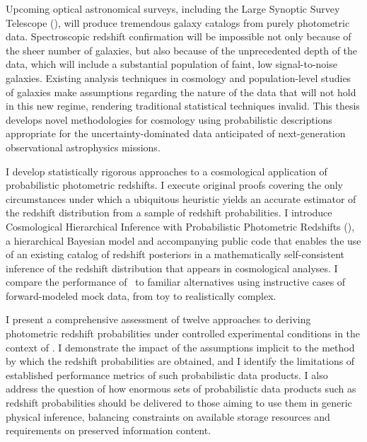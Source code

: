 Upcoming optical astronomical surveys, including the Large Synoptic Survey Telescope (\lsst), will produce tremendous galaxy catalogs from purely photometric data.
Spectroscopic redshift confirmation will be impossible not only because of the sheer number of galaxies, but also because of the unprecedented depth of the data, which will include a substantial population of faint, low signal-to-noise galaxies.
Existing analysis techniques in cosmology and population-level studies of galaxies make assumptions regarding the nature of the data that will not hold in this new regime, rendering traditional statistical techniques invalid.
This thesis develops novel methodologies for cosmology using probabilistic descriptions appropriate for the uncertainty-dominated data anticipated of next-generation observational astrophysics missions. 

I develop statistically rigorous approaches to a cosmological application of probabilistic photometric redshifts.
I execute original proofs covering the only circumstances under which a ubiquitous heuristic yields an accurate estimator of the redshift distribution from a sample of redshift probabilities.
I introduce Cosmological Hierarchical Inference with Probabilistic Photometric Redshifts (\Chippr), a hierarchical Bayesian model and accompanying public code that enables the use of an existing catalog of redshift posteriors in a mathematically self-consistent inference of the redshift distribution that appears in cosmological analyses.
I compare the performance of \Chippr\ to familiar alternatives using instructive cases of forward-modeled mock data, from toy to realistically complex.

I present a comprehensive assessment of twelve approaches to deriving photometric redshift probabilities under controlled experimental conditions in the context of \lsst.
I demonstrate the impact of the assumptions implicit to the method by which the redshift probabilities are obtained, and I identify the limitations of established performance metrics of such probabilistic data products.
I also address the question of how enormous sets of probabilistic data products such as redshift probabilities should be delivered to those aiming to use them in generic physical inference, balancing constraints on available storage resources and requirements on preserved information content.


